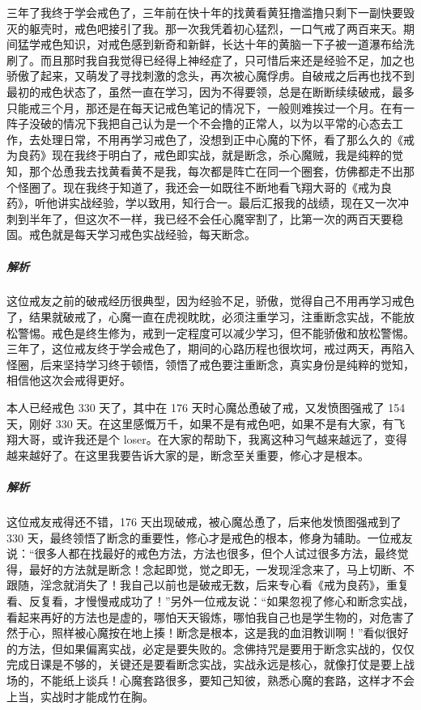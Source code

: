 \begin{case}[各种断念方式的比较]
    三年了我终于学会戒色了，三年前在快十年的找黄看黄狂撸滥撸只剩下一副快要毁灭的躯壳时，戒色吧接引了我。那一次我凭着初心猛烈，一口气戒了两百来天。期间猛学戒色知识，对戒色感到新奇和新鲜，长达十年的黄脑一下子被一道瀑布给洗刷了。而且那时我自我觉得已经得上神经症了，只可惜后来还是经验不足，加之也骄傲了起来，又萌发了寻找刺激的念头，再次被心魔俘虏。自破戒之后再也找不到最初的戒色状态了，虽然一直在学习，因为不得要领，总是在断断续续破戒，最多只能戒三个月，那还是在每天记戒色笔记的情况下，一般则难挨过一个月。在有一阵子没破的情况下我把自己认为是一个不会撸的正常人，以为以平常的心态去工作，去处理日常，不用再学习戒色了，没想到正中心魔的下怀，看了那么久的《戒为良药》现在我终于明白了，戒色即实战，就是断念，杀心魔贼，我是纯粹的觉知，那个怂恿我去找黄看黄不是我，每次都是阵亡在同一个圈套，仿佛都走不出那个怪圈了。现在我终于知道了，我还会一如既往不断地看飞翔大哥的《戒为良药》，听他讲实战经验，学以致用，知行合一。最后汇报我的战绩，现在又一次冲刺到半年了，但这次不一样，我已经不会任心魔宰割了，比第一次的两百天要稳固。戒色就是每天学习戒色实战经验，每天断念。
    \subparagraph{解析} 这位戒友之前的破戒经历很典型，因为经验不足，骄傲，觉得自己不用再学习戒色了，结果就破戒了，心魔一直在虎视眈眈，必须注重学习，注重断念实战，不能放松警惕。戒色是终生修为，戒到一定程度可以减少学习，但不能骄傲和放松警惕。三年了，这位戒友终于学会戒色了，期间的心路历程也很坎坷，戒过两天，再陷入怪圈，后来坚持学习终于顿悟，领悟了戒色要注重断念，真实身份是纯粹的觉知，相信他这次会戒得更好。
\end{case}

\begin{case}[各种断念方式的比较]
    本人已经戒色 330 天了，其中在 176 天时心魔怂恿破了戒，又发愤图强戒了 154 天，刚好 330 天。在这里感慨万千，如果不是有戒色吧，如果不是有大家，有飞翔大哥，或许我还是个 loser。在大家的帮助下，我离这种习气越来越远了，变得越来越好了。在这里我要告诉大家的是，断念至关重要，修心才是根本。
    \subparagraph{解析} 这位戒友戒得还不错，176 天出现破戒，被心魔怂恿了，后来他发愤图强戒到了 330 天，最终领悟了断念的重要性，修心才是戒色的根本，修身为辅助。一位戒友说：“很多人都在找最好的戒色方法，方法也很多，但个人试过很多方法，最终觉得，最好的方法就是断念！念起即觉，觉之即无，一发现淫念来了，马上切断、不跟随，淫念就消失了！我自己以前也是破戒无数，后来专心看《戒为良药》，重复看、反复看，才慢慢戒成功了！”另外一位戒友说：“如果忽视了修心和断念实战，看起来再好的方法也是虚的，哪怕天天锻炼，哪怕我自己也是学生物的，对危害了然于心，照样被心魔按在地上揍！断念是根本，这是我的血泪教训啊！”看似很好的方法，但如果偏离实战，必定是要失败的。念佛持咒是要用于断念实战的，仅仅完成日课是不够的，关键还是要看断念实战，实战永远是核心，就像打仗是要上战场的，不能纸上谈兵！心魔套路很多，要知己知彼，熟悉心魔的套路，这样才不会上当，实战时才能成竹在胸。
\end{case}

